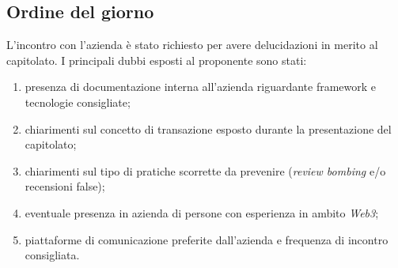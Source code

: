 \subsection{Ordine del giorno}
L'incontro con l'azienda è stato richiesto per avere delucidazioni in merito al capitolato. I principali dubbi esposti al proponente sono stati:
\begin{enumerate}
	\item presenza di documentazione interna all'azienda riguardante framework e tecnologie consigliate;
	\item chiarimenti sul concetto di transazione esposto durante la presentazione del
	capitolato;
	\item chiarimenti sul tipo di pratiche scorrette da prevenire (\emph{review bombing} e/o recensioni false);
	\item eventuale presenza in azienda di persone con esperienza in ambito \emph{Web3};
	\item piattaforme di comunicazione preferite dall'azienda e frequenza di incontro
	consigliata.
\end{enumerate}
